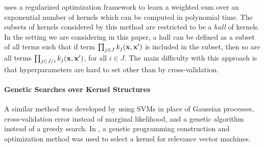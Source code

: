 \documentclass[twoside]{article}
\begin{document}
\cite{Bach_HKL} uses a regularized optimization framework to learn a weighted sum over an exponential number of kernels which can be computed in polynomial time.
The subsets of kernels considered by this method are restricted to be a \textit{hull} of kernels. In the setting we are considering in this paper, a hull can be defined as a subset of all terms such that if term $\prod_{j \in J} k_j(\bf x, x')$ is included in the subset, then so are all terms $\prod_{j \in J / i} k_j(\bf x, x')$, for all $i \in J$.
%
The main difficulty with this approach is that hyperparameters are hard to set other than by cross-validation. 




\paragraph{Genetic Searches over Kernel Structures}
A similar method was developed by \cite{diosan2007evolving} using SVMs in place of Gaussian processes, cross-validation error instead of marginal likelihood, and a genetic algorithm instead of a greedy search.  
In \cite{bing2010gp}, a genetic programming construction and optimization method was used to select a kernel for relevance vector machines.
\end{document}
